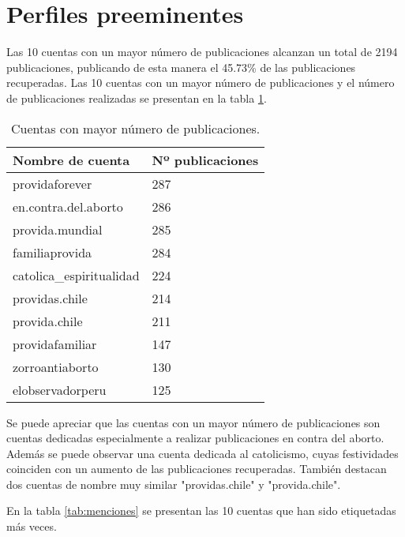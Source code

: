 \documentclass{article}
\begin{document}
\section{Perfiles preeminentes}

Las 10 cuentas con un mayor número de publicaciones alcanzan un total de 2194 publicaciones, publicando de esta manera el 45.73\% de las publicaciones recuperadas. Las 10 cuentas con un mayor número de publicaciones y el número de publicaciones realizadas se presentan en la tabla \ref{tab:cuentasPublicaciones}.

\begin{table}[h!]
\centering
\begin{tabular}{|l|l|}
\hline
Nombre de cuenta         & Nº publicaciones \\ \hline
providaforever           & 287              \\ \hline
en.contra.del.aborto     & 286              \\ \hline
provida.mundial          & 285              \\ \hline
familiaprovida           & 284              \\ \hline
catolica\_espiritualidad & 224              \\ \hline
providas.chile           & 214              \\ \hline
provida.chile            & 211              \\ \hline
providafamiliar          & 147              \\ \hline
zorroantiaborto          & 130              \\ \hline
elobservadorperu         & 125              \\ \hline
\end{tabular}
\caption{Cuentas con mayor número de publicaciones.}
\label{tab:cuentasPublicaciones}
\end{table}

Se puede apreciar que las cuentas con un mayor número de publicaciones son cuentas dedicadas especialmente a realizar publicaciones en contra del aborto. Además se puede observar una cuenta dedicada al catolicismo, cuyas festividades coinciden con un aumento de las publicaciones recuperadas. También destacan dos cuentas de nombre muy similar "providas.chile" y "provida.chile".

En la tabla \ref{tab:menciones} se presentan las 10 cuentas que han sido etiquetadas más veces.
\end{document}

